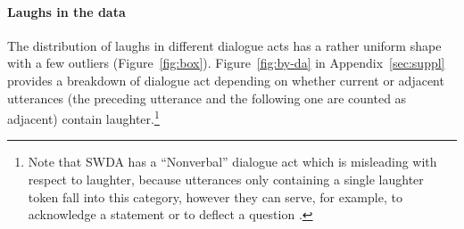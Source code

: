 \documentclass[11pt,a4paper]{article}
\begin{document}
\paragraph{Laughs in the data}
The distribution of laughs in different dialogue acts has a rather uniform shape with a few outliers (Figure~\ref{fig:box}). 
Figure~\ref{fig:by-da} in Appendix~\ref{sec:suppl} provides a breakdown of dialogue act depending on whether current or adjacent utterances (the preceding utterance and the following one are counted as adjacent) contain laughter.\footnote{Note that SWDA has a ``Nonverbal'' dialogue act which is misleading with respect to laughter, because utterances only containing a single laughter token fall into this category, however they can serve, for example, to acknowledge a statement or to deflect a question  \citep{mazzocconi2019phd}.}
\end{document}
